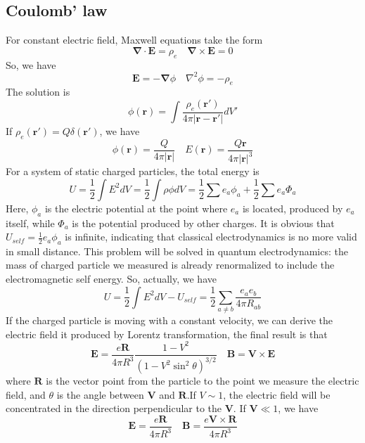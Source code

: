 \subsection{Coulomb' law}
For constant electric field, Maxwell equations take the form 
\[\bm{\nabla} \cdot \bm{E} = \rho_e \quad \bm{\nabla} \times \bm{E} = 0\]
So, we have
\[\bm{E} = -\bm{\nabla} \phi \quad \nabla^2 \phi = -\rho_e \]
The solution is
\[\phi(\bm{r}) = \int  \frac{\rho_e(\bm{r}')}{4\pi|\bm{r}-\bm{r}'|} dV'\]
If $\rho_e(\bm{r}') = Q \delta(\bm{r}')$, we have
\[\phi(\bm{r}) =  \frac{Q}{4\pi|\bm{r}|} \quad E(\bm{r}) = \frac{Q\bm{r}}{4\pi|\bm{r}|^3}\]
For a system of static charged particles, the total energy is
\[U = \frac{1}{2}\int E^2 dV = \frac{1}{2} \int \rho \phi dV = \frac{1}{2} \sum e_a \phi_a + \frac{1}{2}\sum e_a \Phi_a\]
Here, $\phi_a$ is the electric potential at the point where $e_a$ is located, produced by $e_a$ itself, while  $\Phi_a$ is the potential produced by other charges. It is obvious that $U_{self} = \frac{1}{2} e_a \phi_a$ is infinite, indicating that classical electrodynamics is no more valid in small distance. This problem will be solved in quantum electrodynamics: the mass of charged particle we measured is already renormalized to include the electromagnetic self energy. So, actually, we have
\[U = \frac{1}{2}\int E^2 dV - U_{self} = \frac{1}{2}\sum_{a \ne b} \frac{e_a e_b}{4\pi R_{ab}}\]
If the charged particle is moving with a constant velocity, we can derive the electric field it produced by Lorentz transformation, the final result is that
\[\bm{E} = \frac{e\bm{R}}{4\pi R^3} \frac{1-V^2}{(1-V^2\sin^2\theta)^{3/2}} \quad \bm{B} = \bm{V} \times \bm{E}\]
where $\bm{R}$ is the vector point from the particle to the point we measure the electric field, and $\theta$ is the angle between $\bm{V}$ and $\bm{R}$.If $V \sim 1$, the electric field will be concentrated in the direction perpendicular to the $\bm{V}$. If $\bm{V} \ll 1$, we have
\[\bm{E} = \frac{e\bm{R}}{4\pi R^3} \quad \bm{B} = \frac{e\bm{V} \times\bm{R}}{4\pi R^3}\]


